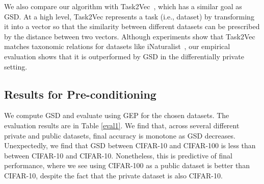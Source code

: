 \documentclass[11pt]{article}
\begin{document}

We also compare our algorithm with Task2Vec~\cite{task2vec}, which has a similar goal as GSD. At a high level, Task2Vec represents a task (i.e., dataset) by transforming it into a vector so that the similarity between different datasets can be prescribed by the distance between two vectors. Although experiments show that Task2Vec matches taxonomic relations for datasets like iNaturalist~\cite{inatural}, our empirical evaluation shows that it is outperformed by GSD in the differentially private setting.



\subsection{Results for Pre-conditioning}
We compute GSD and evaluate using GEP for the chosen datasets. The evaluation results are in Table \ref{eval1}. We find that, across several different private and public datasets, final accuracy is monotone as GSD decreases.
Unexpectedly, we find that GSD between CIFAR-10 and CIFAR-100 is less than between CIFAR-10 and CIFAR-10. 
Nonetheless, this is predictive of final performance, where we see using CIFAR-100 as a public dataset is better than CIFAR-10, despite the fact that the private dataset is also CIFAR-10.

\end{document}
